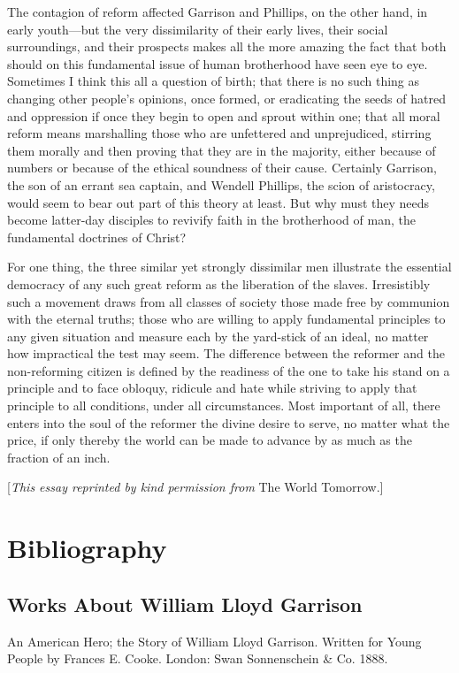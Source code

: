 \documentclass{book}
\begin{document}
The contagion of reform affected Garrison and Phillips, on the other hand, in early youth—but the very dissimilarity of their early lives, their social surroundings, and their prospects makes all the more amazing the fact that both should on this fundamental issue of human brotherhood have seen eye to eye. Sometimes I think this all a question of birth; that there is no such thing as changing other people’s opinions, once formed, or eradicating the seeds of hatred and oppression if once they begin to open and sprout within one; that all moral reform means marshalling those who are unfettered and unprejudiced, stirring them morally and then proving that they are in the majority, either because of numbers or because of the ethical soundness of their cause. Certainly Garrison, the son of an errant sea captain, and Wendell Phillips, the scion of aristocracy, would seem to bear out part of this theory at least. But why must they needs become latter-day disciples to revivify faith in the brotherhood of man, the fundamental doctrines of Christ?

For one thing, the three similar yet strongly dissimilar men illustrate the essential democracy of any such great reform as the liberation of the slaves. Irresistibly such a movement draws from all classes of society those made free by communion with the eternal truths; those who are willing to apply fundamental principles to any given situation and measure each by the yard-stick of an ideal, no matter how impractical the test may seem. The difference between the reformer and the non-reforming citizen is defined by the readiness of the one to take his stand on a principle and to face obloquy, ridicule and hate while striving to apply that principle to all conditions, under all circumstances. Most important of all, there enters into the soul of the reformer the divine desire to serve, no matter what the price, if only thereby the world can be made to advance by as much as the fraction of an inch.

{[}\emph{This essay reprinted by kind permission from} The World Tomorrow.{]}

\chapter{Bibliography}
\label{chapter-6}
\section{Works About William Lloyd Garrison}
An American Hero; the Story of William Lloyd Garrison. Written for Young People by Frances E. Cooke. London: Swan Sonnenschein \& Co. 1888.
\end{document}
